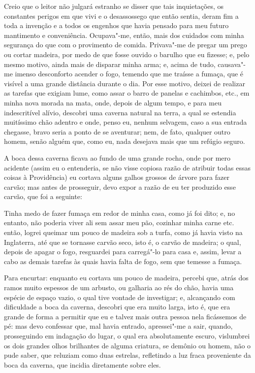Creio que o leitor não julgará estranho se disser que tais inquietações,
os constantes perigos em que vivi e o desassossego que então sentia,
deram fim a toda a invenção e a todos os engenhos que havia pensado para
meu futuro mantimento e conveniência. Ocupava"-me, então, mais dos
cuidados com minha segurança do que com o provimento de comida.
Privava"-me de pregar um prego ou cortar madeira, por medo de que fosse
ouvido o barulho que eu fizesse; e, pelo mesmo motivo, ainda mais de
disparar minha arma; e, acima de tudo, causava"-me imenso desconforto
acender o fogo, temendo que me traísse a fumaça, que é visível a uma
grande distância durante o dia. Por esse motivo, deixei de realizar as
tarefas que exigiam lume, como assar o barro de panelas e cachimbos,
etc., em minha nova morada na mata, onde, depois de algum tempo, e para
meu indescritível alívio, descobri uma caverna natural na terra, a qual
se estendia muitíssimo chão adentro e onde, penso eu, nenhum selvagem,
caso a sua entrada chegasse, bravo seria a ponto de se aventurar; nem,
de fato, qualquer outro homem, senão alguém que, como eu, nada desejava
mais que um refúgio seguro.

A boca dessa caverna ficava ao fundo de uma grande rocha, onde por mero
acidente (assim eu o entenderia, se não visse copiosa razão de atribuir
todas essas coisas à Providência) eu cortava alguns galhos grossos de
árvore para fazer carvão; mas antes de prosseguir, devo expor a razão de
eu ter produzido esse carvão, que foi a seguinte:

Tinha medo de fazer fumaça em redor de minha casa, como já foi dito; e,
no entanto, não poderia viver ali sem assar meu pão, cozinhar minha
carne etc. então, logrei queimar um pouco de madeira sob a turfa, como
já havia visto na Inglaterra, até que se tornasse carvão seco, isto é, o
carvão de madeira; o qual, depois de apagar o fogo, resguardei para
carregá"-lo para casa e, assim, levar a cabo as demais tarefas às quais
havia falta de fogo, sem que temesse a fumaça.

Para encurtar: enquanto eu cortava um pouco de madeira, percebi que,
atrás dos ramos muito espessos de um arbusto, ou galharia ao rés do
chão, havia uma espécie de espaço vazio, o qual tive vontade de
investigar; e, alcançando com dificuldade a boca da caverna, descobri
que era muito larga, isto é, que era grande de forma a permitir que eu e
talvez mais outra pessoa nela ficássemos de pé: mas devo confessar que,
mal havia entrado, apressei"-me a sair, quando, prosseguindo em indagação
do lugar, o qual era absolutamente escuro, vislumbrei os dois grandes
olhos brilhantes de alguma criatura, se demônio ou homem, não o pude
saber, que reluziam como duas estrelas, refletindo a luz fraca
proveniente da boca da caverna, que incidia diretamente sobre eles.

